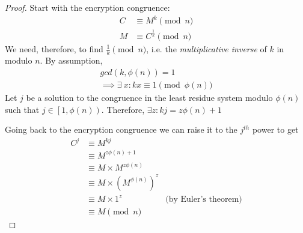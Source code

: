 \documentclass[12pt, titlepage]{article}
\begin{document}
    \begin{proof}
        Start with the encryption congruence: 
        \begin{align*}
            C & \equiv M^{k} \pmod{n}\\
            M & \equiv C^{\frac{1}{k}} \pmod{n}
        \end{align*}
        We need, therefore, to find $\frac{1}{k} \pmod{n}$, i.e. the \emph{multiplicative
        inverse} of $k$ in modulo $n$. By assumption, 
        \begin{align*}
            gcd(k, \phi (n)) = 1 \\
            \implies \exists\ x: kx \equiv 1 \pmod{\phi (n)}
        \end{align*}
        Let $j$ be a solution to the congruence in the least residue system modulo $\phi
        (n)$ such that $j \in \left[1, \phi (n) \right)$.  Therefore, $\exists z: kj = z\phi
        (n) + 1$

        Going back to the encryption congruence we can raise it to the $j^{th}$ power to get
        \begin{align*}
            C^j & \equiv M^{kj}\\ 
                & \equiv M^{z\phi (n) + 1}\\
                & \equiv M\times M^{z \phi(n)}\\
                & \equiv M\times (M^{\phi (n)})^z\\
                & \equiv M\times 1^z                &\text{(by Euler's theorem)}\\
                & \equiv M \pmod{n}
        \end{align*}
    \end{proof}
    
\end{document}
